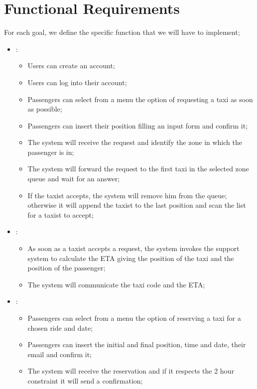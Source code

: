 ﻿
\section { Functional Requirements}
 
For each goal, we define the specific function that we will have to implement;\\
\begin {itemize}
\item [G1]:
	\begin{itemize}
	\item Users can create an account;
	\item Users can log into their account;
	\item Passengers can select from a menu the option of requesting a taxi as soon as possible; 
	\item Passengers can insert their position filling an input form and confirm it;
	\item The system will receive the request and identify the zone in which the passenger is in;
	\item The system will forward the request to the first taxi in the selected zone queue and wait for an answer;
	\item If the taxist accepts, the system will remove him from the queue; otherwise it will append the taxist to the last position and
scan the list for a taxist to accept;
	\end{itemize}
\item [G2]:
	\begin{itemize}
	\item As soon as a taxist accepts a request, the system invokes the support system to calculate the ETA giving the position of the taxi and the position of the passenger;
	\item The system will communicate the taxi code and the ETA;
	\end{itemize}
\item [G3]:
	\begin{itemize}
	\item Passengers can select from a menu the option of reserving a taxi for a chosen ride and date; 
	\item Passengers can insert the initial and final position, time and date, their email and confirm it;%
	\item The system will receive the reservation and if it respects the 2 hour constraint it will send a confirmation;

\end{itemize}
\end{itemize}
